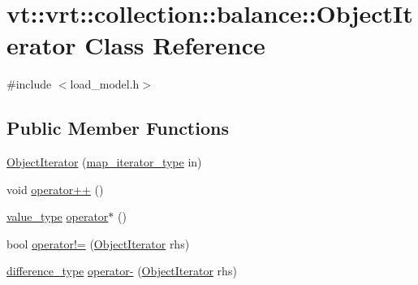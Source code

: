 \hypertarget{classvt_1_1vrt_1_1collection_1_1balance_1_1_object_iterator}{}\section{vt\+:\+:vrt\+:\+:collection\+:\+:balance\+:\+:Object\+Iterator Class Reference}
\label{classvt_1_1vrt_1_1collection_1_1balance_1_1_object_iterator}


{\ttfamily \#include $<$load\+\_\+model.\+h$>$}

\subsection*{Public Member Functions}
\begin{DoxyCompactItemize}
\item 
\hyperlink{classvt_1_1vrt_1_1collection_1_1balance_1_1_object_iterator_ada427f2b9cc27798aa924b4d39dc05ad}{Object\+Iterator} (\hyperlink{classvt_1_1vrt_1_1collection_1_1balance_1_1_object_iterator_a9100746b4842b68f94f569a9e8e2cda0}{map\+\_\+iterator\+\_\+type} in)
\item 
void \hyperlink{classvt_1_1vrt_1_1collection_1_1balance_1_1_object_iterator_a22189471c74df1c8c1a29edf6f659244}{operator++} ()
\item 
\hyperlink{classvt_1_1vrt_1_1collection_1_1balance_1_1_object_iterator_aae1089959ea6df7ad5a69e3c07eaa338}{value\+\_\+type} \hyperlink{classvt_1_1vrt_1_1collection_1_1balance_1_1_object_iterator_af749c7edf7c0100d48c6939fa19ab5ce}{operator$\ast$} ()
\item 
bool \hyperlink{classvt_1_1vrt_1_1collection_1_1balance_1_1_object_iterator_a8eb66be365098d372f541863b6397962}{operator!=} (\hyperlink{classvt_1_1vrt_1_1collection_1_1balance_1_1_object_iterator}{Object\+Iterator} rhs)
\item 
\hyperlink{classvt_1_1vrt_1_1collection_1_1balance_1_1_object_iterator_a97e592ab92b9cdf3156c10aacad7723c}{difference\+\_\+type} \hyperlink{classvt_1_1vrt_1_1collection_1_1balance_1_1_object_iterator_ae958537b0e132b982d0e360a54ea1f89}{operator-\/} (\hyperlink{classvt_1_1vrt_1_1collection_1_1balance_1_1_object_iterator}{Object\+Iterator} rhs)
\end{DoxyCompactItemize}
